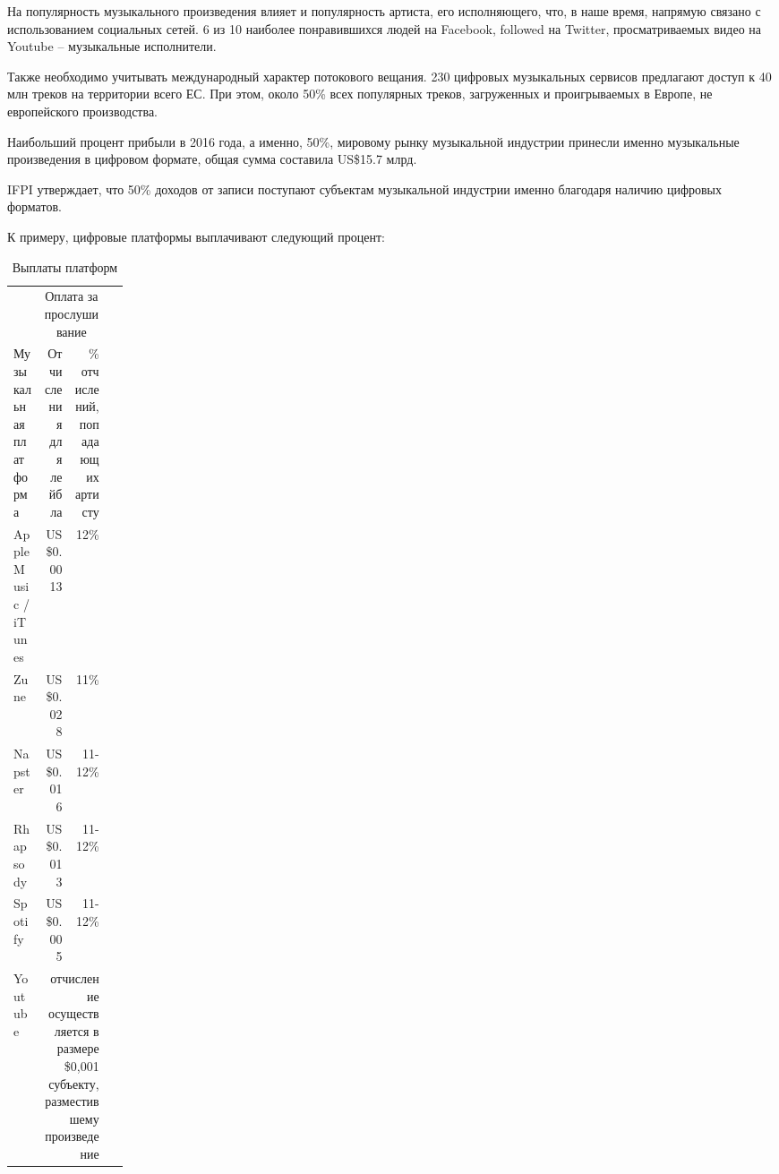 \documentclass[12pt]{report}
\begin{document}
На популярность музыкального произведения влияет и популярность артиста, его исполняющего, что, в наше время, напрямую связано с использованием социальных сетей. 6 из 10 наиболее понравившихся людей на Facebook, followed на Twitter, просматриваемых видео на Youtube – музыкальные исполнители.

Также необходимо учитывать международный характер потокового вещания. 230 цифровых музыкальных сервисов предлагают доступ к 40 млн треков на территории всего ЕС. При этом, около 50\% всех популярных треков, загруженных и проигрываемых в Европе, не европейского производства.  

Наибольший процент прибыли в 2016 года, а именно, 50\%, мировому рынку музыкальной индустрии принесли именно музыкальные произведения в цифровом формате, общая сумма составила US\$15.7 млрд.

IFPI утверждает, что 50\% доходов от записи поступают субъектам музыкальной индустрии именно благодаря наличию цифровых форматов. 

К примеру, цифровые платформы выплачивают следующий процент:


\def\PayPlay{Оплата за прослушивание}
\def\PayBuy{Оплата при покупке песни}
\def\Platform{Музыкальная платформа}
\def\LabelPartion{Отчисления для лейбла}
\def\ArtistPartion{\% отчислений, попадающих артисту}
\def\YoutubePay{отчисление осуществляется в размере \$0,001 субъекту, разместившему произведение}

\begin{table}[h]
\centering
\caption{Выплаты платформ}
\begin{tabular}{lrrp{0.15\linewidth}}
\toprule
	& \multicolumn{2}{c}{\PayPlay} \\
	\Platform & 
	\multicolumn{1}{p{0.22\linewidth}}{\LabelPartion} &
	\multicolumn{1}{p{0.22\linewidth}}{\ArtistPartion} \\
\bottomrule
\midrule
Apple Music / iTunes		& US \$0.0013 	& 12\% \\
Zune								& US \$0.028 	& 11\% \\
Napster						& US \$0.016 	& 11-12\% \\
Rhapsody						& US \$0.013 	& 11-12\% \\
Spotify							& US \$0.005 	& 11-12\% \\
Youtube 						& \multicolumn{2}{p{0.48\linewidth}}{\YoutubePay} \\
\bottomrule
\end{tabular}
\end{table}
\end{document}
